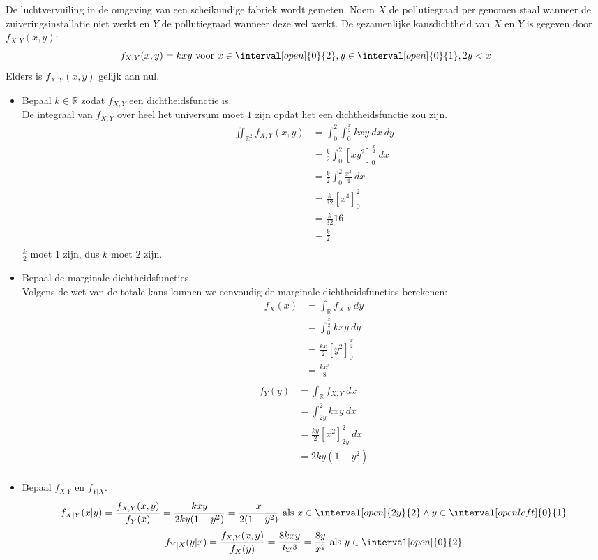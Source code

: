 \documentclass[main.tex]{subfiles}
\begin{document}
\begin{oef}
  De luchtvervuiling in de omgeving van een scheikundige fabriek wordt gemeten.
  Noem $X$ de pollutiegraad per genomen staal wanneer de zuiveringsinstallatie niet werkt en $Y$ de  pollutiegraad wanneer deze wel werkt.
  De gezamenlijke kansdichtheid van $X$ en $Y$ is gegeven door $f_{X,Y}(x,y)$:
  \[ f_{X,Y}(x,y) = kxy \text{ voor } x \in \interval[open]{0}{2}, y \in \interval[open]{0}{1}, 2y < x \]
  Elders is $f_{X,Y}(x,y)$ gelijk aan nul.
  \begin{itemize}
  \item Bepaal $k\in \mathbb{R}$ zodat $f_{X,Y}$ een dichtheidsfunctie is.\\
    De integraal van $f_{X,Y}$ over heel het universum moet $1$ zijn opdat het een dichtheidsfunctie zou zijn.
    \[
    \begin{array}{rl}
      \iint_{\mathbb{R}^{2}}f_{X,Y}(x,y)
      &= \int_{0}^{2}\int_{0}^{\frac{x}{2}}kxy\ dx\ dy\\
      &= \frac{k}{2} \int_{0}^{2}\left[ xy^{2}\right]_{0}^{\frac{x}{2}}\ dx\\
      &= \frac{k}{2} \int_{0}^{2}\frac{x^{3}}{4}\ dx\\
      &= \frac{k}{32} \left[ x^{4}\right]_{0}^{2}\\
      &= \frac{k}{32} 16\\
      &= \frac{k}{2}\\
    \end{array}
    \]
    $\frac{k}{2}$ moet $1$ zijn, dus $k$ moet $2$ zijn.
  \item Bepaal de marginale dichtheidsfuncties.\\
    Volgens de wet van de totale kans kunnen we eenvoudig de marginale dichtheidsfuncties berekenen:
    \[
    \begin{array}{rl}
      f_{X}(x)
      &= \int_{\mathbb{R}}f_{X,Y}\ dy\\
      &= \int_{0}^{\frac{x}{2}} kxy\ dy\\
      &= \frac{kx}{2} \left[ y^{2} \right]_{0}^{\frac{x}{2}}\\
      &= \frac{kx^{3}}{8}\\
    \end{array}
    \]
    \[
    \begin{array}{rl}
      f_{Y}(y)
      &= \int_{\mathbb{R}}f_{X,Y}\ dx\\
      &= \int_{2y}^{2} kxy\ dx\\
      &= \frac{ky}{2} \left[ x^{2} \right]_{2y}^{2}\ dx\\
      &= 2ky(1-y^{2})\\
    \end{array}
    \]
  \item Bepaal $f_{X|Y}$ en $f_{Y|X}$.\\
    \[ f_{X|Y}(x|y) = \frac{f_{X,Y}(x,y)}{f_{Y}(x)} = \frac{kxy}{2ky(1-y^{2})} = \frac{x}{2(1-y^{2})} \text{ als } x\in \interval[open]{2y}{2} \wedge y \in \interval[open left]{0}{1} \]
    \[ f_{Y|X}(y|x) = \frac{f_{X,Y}(x,y)}{f_{X}(y)} = \frac{8kxy}{kx^{3}} = \frac{8y}{x^{2}} \text{ als } y \in \interval[open]{0}{2} \]
  \end{itemize}
\end{oef}
\end{document}
